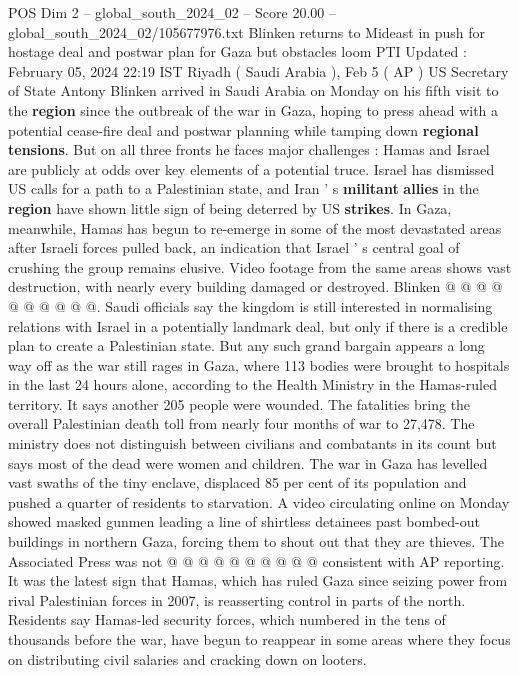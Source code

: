 \begin{textsample}{POS Dim 2 – global\_south\_2024\_02 – Score 20.00 – global\_south\_2024\_02/105677976.txt}  \label{ex:f2_pos_194}
Blinken returns to Mideast in push for hostage deal and postwar plan for Gaza but obstacles loom PTI Updated : February 05, 2024 22:19 IST Riyadh ( Saudi Arabia ), Feb 5 ( AP ) US Secretary of State Antony Blinken arrived in Saudi Arabia on Monday on his fifth visit to the \textbf{region} since the outbreak of the war in Gaza, hoping to press ahead with a potential cease-fire deal and postwar planning while tamping down \textbf{regional} \textbf{tensions}.
But on all three fronts he faces major challenges : Hamas and Israel are publicly at odds over key elements of a potential truce.
Israel has dismissed US calls for a path to a Palestinian state, and Iran ' s \textbf{militant} \textbf{allies} in the \textbf{region} have shown little sign of being deterred by US \textbf{strikes}.
In Gaza, meanwhile, Hamas has begun to re-emerge in some of the most devastated areas after Israeli forces pulled back, an indication that Israel ' s central goal of crushing the group remains elusive.
Video footage from the same areas shows vast destruction, with nearly every building damaged or destroyed.
Blinken @ @ @ @ @ @ @ @ @ @.
Saudi officials say the kingdom is still interested in normalising relations with Israel in a potentially landmark deal, but only if there is a credible plan to create a Palestinian state.
But any such grand bargain appears a long way off as the war still rages in Gaza, where 113 bodies were brought to hospitals in the last 24 hours alone, according to the Health Ministry in the Hamas-ruled territory.
It says another 205 people were wounded.
The fatalities bring the overall Palestinian death toll from nearly four months of war to 27,478.
The ministry does not distinguish between civilians and combatants in its count but says most of the dead were women and children.
The war in Gaza has levelled vast swaths of the tiny enclave, displaced 85 per cent of its population and pushed a quarter of residents to starvation.
A video circulating online on Monday showed masked gunmen leading a line of shirtless detainees past bombed-out buildings in northern Gaza, forcing them to shout out that they are thieves.
The Associated Press was not @ @ @ @ @ @ @ @ @ @ consistent with AP reporting.
It was the latest sign that Hamas, which has ruled Gaza since seizing power from rival Palestinian forces in 2007, is reasserting control in parts of the north.
Residents say Hamas-led security forces, which numbered in the tens of thousands before the war, have begun to reappear in some areas where they focus on distributing civil salaries and cracking down on looters.

\end{textsample}
